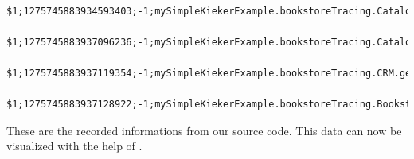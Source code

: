       \begin{lstlisting}
	$1;1275745883934593403;-1;mySimpleKiekerExample.bookstoreTracing.Catalog.getBook(false);sessionID;0;1275745883931011663;1275745883933424540;vnName;1;1
	$1;1275745883937096236;-1;mySimpleKiekerExample.bookstoreTracing.Catalog.getBook(false);sessionID;0;1275745883935003302;1275745883937075214;vnName;3;2
	$1;1275745883937119354;-1;mySimpleKiekerExample.bookstoreTracing.CRM.getOffers();sessionID;0;1275745883934661568;1275745883937111043;vnName;2;1
	$1;1275745883937128922;-1;mySimpleKiekerExample.bookstoreTracing.Bookstore.searchBook();sessionID;0;1275745883931007961;1275745883937123824;vnName;0;0 
      \end{lstlisting}
      These are the recorded informations from our source code. This data can now be visualized with the help of \Kieker.

